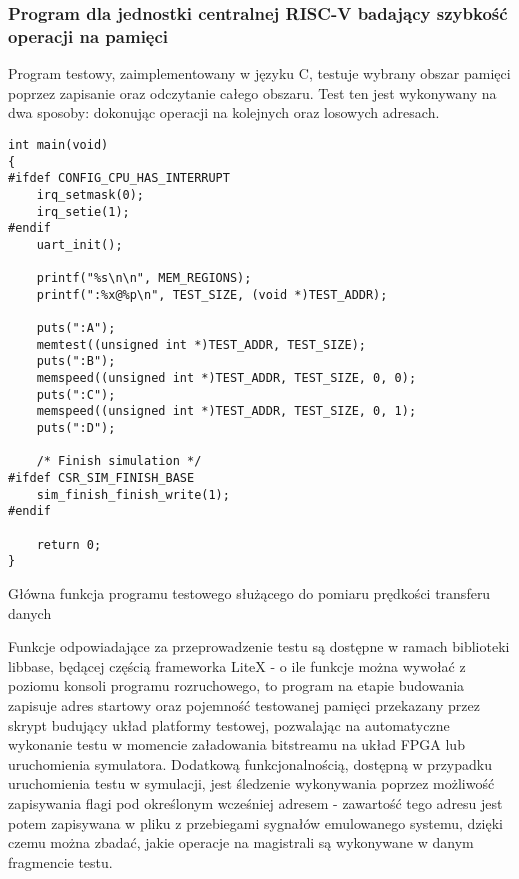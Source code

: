 
\subsubsection{Program dla jednostki centralnej RISC-V badający szybkość operacji na pamięci}

Program testowy, zaimplementowany w języku C, testuje wybrany obszar pamięci poprzez zapisanie oraz odczytanie całego obszaru. Test ten jest wykonywany na dwa sposoby: dokonując operacji na kolejnych oraz losowych adresach.

\begin{listing}[H]
\begin{verbatim}
int main(void)
{
#ifdef CONFIG_CPU_HAS_INTERRUPT
    irq_setmask(0);
    irq_setie(1);
#endif
    uart_init();

    printf("%s\n\n", MEM_REGIONS);
    printf(":%x@%p\n", TEST_SIZE, (void *)TEST_ADDR);

    puts(":A");
    memtest((unsigned int *)TEST_ADDR, TEST_SIZE);
    puts(":B");
    memspeed((unsigned int *)TEST_ADDR, TEST_SIZE, 0, 0);
    puts(":C");
    memspeed((unsigned int *)TEST_ADDR, TEST_SIZE, 0, 1);
    puts(":D");

    /* Finish simulation */
#ifdef CSR_SIM_FINISH_BASE
    sim_finish_finish_write(1);
#endif

    return 0;
}
\end{verbatim}
\caption{\label{lst:benchmark-main.c}Główna funkcja programu testowego służącego do pomiaru prędkości transferu danych}
\end{listing}

Funkcje odpowiadające za przeprowadzenie testu są dostępne w ramach biblioteki libbase, będącej częścią frameworka LiteX - o ile funkcje można wywołać z poziomu konsoli programu rozruchowego, to program na etapie budowania zapisuje adres startowy oraz pojemność testowanej pamięci przekazany przez skrypt budujący układ platformy testowej, pozwalając na automatyczne wykonanie testu w momencie załadowania bitstreamu na układ FPGA lub uruchomienia symulatora.
Dodatkową funkcjonalnością, dostępną w przypadku uruchomienia testu w symulacji, jest śledzenie wykonywania poprzez możliwość zapisywania flagi pod określonym wcześniej adresem - zawartość tego adresu jest potem zapisywana w pliku z przebiegami sygnałów emulowanego systemu, dzięki czemu można zbadać, jakie operacje na magistrali są wykonywane w danym fragmencie testu.

